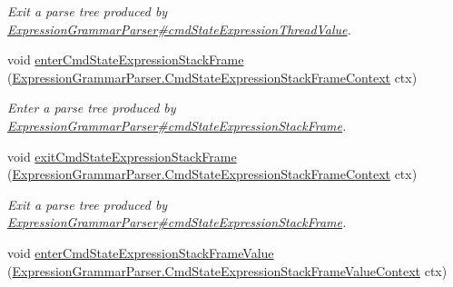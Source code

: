\begin{DoxyCompactItemize}
\begin{DoxyCompactList}\small\item\em Exit a parse tree produced by \hyperlink{classgov_1_1nasa_1_1jpf_1_1inspector_1_1server_1_1expression_1_1parser_1_1_expression_grammar_parser_aa83127fe4f65f96d5da73e78c7bbae2f}{Expression\+Grammar\+Parser\#cmd\+State\+Expression\+Thread\+Value}. \end{DoxyCompactList}\item 
void \hyperlink{interfacegov_1_1nasa_1_1jpf_1_1inspector_1_1server_1_1expression_1_1parser_1_1_expression_grammar_listener_a7b8cf01b29ba141bc3cbe9eb291762e5}{enter\+Cmd\+State\+Expression\+Stack\+Frame} (\hyperlink{classgov_1_1nasa_1_1jpf_1_1inspector_1_1server_1_1expression_1_1parser_1_1_expression_grammar_pa1661807291671005dea18d81e1943036}{Expression\+Grammar\+Parser.\+Cmd\+State\+Expression\+Stack\+Frame\+Context} ctx)
\begin{DoxyCompactList}\small\item\em Enter a parse tree produced by \hyperlink{classgov_1_1nasa_1_1jpf_1_1inspector_1_1server_1_1expression_1_1parser_1_1_expression_grammar_parser_a5e0feabb2511339d22851a433e2a7e19}{Expression\+Grammar\+Parser\#cmd\+State\+Expression\+Stack\+Frame}. \end{DoxyCompactList}\item 
void \hyperlink{interfacegov_1_1nasa_1_1jpf_1_1inspector_1_1server_1_1expression_1_1parser_1_1_expression_grammar_listener_a7698d50f2f2cd9c28b1507c66697c2ab}{exit\+Cmd\+State\+Expression\+Stack\+Frame} (\hyperlink{classgov_1_1nasa_1_1jpf_1_1inspector_1_1server_1_1expression_1_1parser_1_1_expression_grammar_pa1661807291671005dea18d81e1943036}{Expression\+Grammar\+Parser.\+Cmd\+State\+Expression\+Stack\+Frame\+Context} ctx)
\begin{DoxyCompactList}\small\item\em Exit a parse tree produced by \hyperlink{classgov_1_1nasa_1_1jpf_1_1inspector_1_1server_1_1expression_1_1parser_1_1_expression_grammar_parser_a5e0feabb2511339d22851a433e2a7e19}{Expression\+Grammar\+Parser\#cmd\+State\+Expression\+Stack\+Frame}. \end{DoxyCompactList}\item 
void \hyperlink{interfacegov_1_1nasa_1_1jpf_1_1inspector_1_1server_1_1expression_1_1parser_1_1_expression_grammar_listener_a87f46ee0af65e08155f94eae5e3b85e3}{enter\+Cmd\+State\+Expression\+Stack\+Frame\+Value} (\hyperlink{classgov_1_1nasa_1_1jpf_1_1inspector_1_1server_1_1expression_1_1parser_1_1_expression_grammar_pa27eac9bb10e329b6f1427633e5ce16ca}{Expression\+Grammar\+Parser.\+Cmd\+State\+Expression\+Stack\+Frame\+Value\+Context} ctx)

\end{DoxyCompactItemize}
